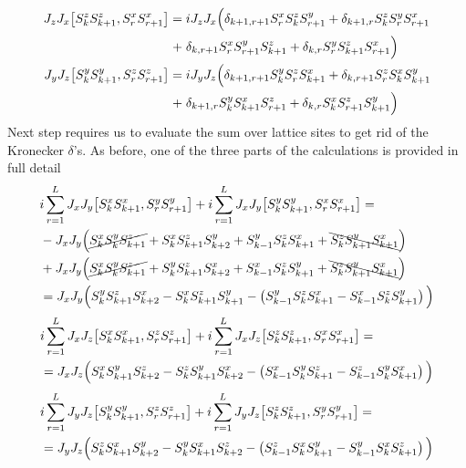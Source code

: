 \begin{align*}
    J_{z} J_{x}\comm{\Sz_{k}\Sz_{k+1}}{\Sx_{r}\Sx_{r+1}} =&\; i J_z J_x \Big( \delta_{k+1,r+1} \Sx_r \Sz_k \Sy_{r+1} + \delta_{k+1,r} \Sz_k \Sy_{r} \Sx_{r+1} \\
    +&\; \delta_{k,r+1} \Sx_r \Sy_{r+1} \Sz_{k+1} +\delta_{k,r} \Sy_r \Sz_{k+1} \Sx_{r+1}\Big)\\ 
    J_{y} J_{z}\comm{\Sy_{k}\Sy_{k+1}}{\Sz_{r}\Sz_{r+1}} =&\; i J_y J_z \Big( \delta_{k+1,r+1} \Sy_k \Sz_r \Sx_{k+1} + \delta_{k,r+1} \Sz_r \Sx_{k} \Sy_{k+1} \\
    +&\; \delta_{k+1,r} \Sy_k \Sx_{k+1} \Sz_{r+1} +\delta_{k,r} \Sx_k \Sz_{r+1} \Sy_{k+1}\Big) 
\end{align*}
Next step requires us to evaluate the sum over lattice sites to get rid of the Kronecker \(\delta{}\)'s. As before, one of the three parts of the calculations is provided in full detail
\begin{align}
    &i\sum_{r=1}^{L}  J_{x} J_{y}\comm{\Sx_{k}\Sx_{k+1}}{\Sy_{r}\Sy_{r+1}} + i\sum_{r=1}^{L} J_{x} J_{y}\comm{\Sy_{k}\Sy_{k+1}}{\Sx_{r}\Sx_{r+1}} =\nonumber \\
    & - J_x J_y \Big( \cancel{\Sx_k \Sy_k \Sz_{k+1}} +  \Sx_k \Sz_{k+1} \Sy_{k+2} + \Sy_{k-1} \Sz_k \Sx_{k+1} +\bcancel{\Sz_k \Sy_{k+1} \Sx_{k+1}}\Big)\nonumber\\
    &+  J_x J_y \Big(  \cancel{\Sx_k \Sy_k \Sz_{k+1}} + \Sy_k \Sz_{k+1} \Sx_{k+2} + \Sx_{k-1} \Sz_k \Sy_{k+1} + \bcancel{\Sz_k \Sy_{k+1} \Sx_{k+1}}\Big)\nonumber\\
    &= J_x J_y \Big( \Sy_k \Sz_{k+1} \Sx_{k+2} - \Sx_k \Sz_{k+1} \Sy_{k+1} - \left(\Sy_{k-1}\Sz_k \Sx_{k+1} - \Sx_{k-1}\Sz_{k}\Sy_{k+1}\right) \Big)
\end{align}
\begin{align}
    &i\sum_{r=1}^{L}  J_{x} J_{z}\comm{\Sx_{k}\Sx_{k+1}}{\Sz_{r}\Sz_{r+1}} + i\sum_{r=1}^{L} J_{x} J_{z}\comm{\Sz_{k}\Sz_{k+1}}{\Sx_{r}\Sx_{r+1}} = \nonumber\\
    &= J_x J_z \Big( \Sx_k \Sy_{k+1} \Sz_{k+2} - \Sz_k \Sy_{k+1} \Sx_{k+2} - \left(\Sx_{k-1}\Sy_k \Sz_{k+1} - \Sz_{k-1}\Sy_{k}\Sx_{k+1}\right) \Big)
\end{align}
\begin{align}    
    &i\sum_{r=1}^{L}  J_{y} J_{z}\comm{\Sy_{k}\Sy_{k+1}}{\Sz_{r}\Sz_{r+1}} + i\sum_{r=1}^{L} J_{y} J_{z}\comm{\Sz_{k}\Sz_{k+1}}{\Sy_{r}\Sy_{r+1}} = \nonumber\\
    &= J_y J_z \Big( \Sz_k \Sx_{k+1} \Sy_{k+2} - \Sy_k \Sx_{k+1} \Sz_{k+2} - \left(\Sz_{k-1}\Sx_k \Sy_{k+1} - \Sy_{k-1}\Sx_{k}\Sz_{k+1}\right) \Big)
\end{align}
